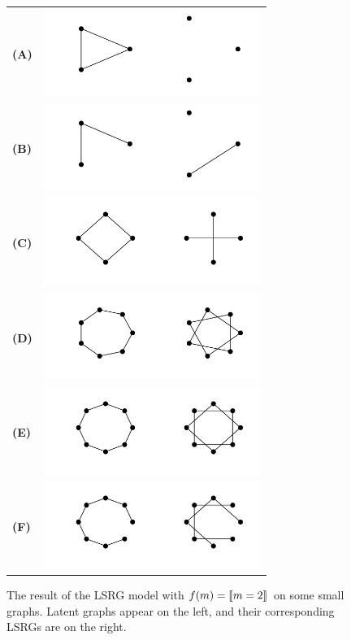 \documentclass[12pt]{article}
\DeclarePairedDelimiter\iverson{\llbracket}{\rrbracket}%
\begin{document}
\begin{figure}[tp]
\begin{center}
\begin{tabular}{m{24pt} m{210pt}}
\textbf{\textsf{(A)}} & \includegraphics[width=200pt]{2_A.png} \\
\textbf{\textsf{(B)}} & \includegraphics[width=200pt]{2_B.png} \\
\textbf{\textsf{(C)}} & \includegraphics[width=200pt]{2_C.png} \\
\textbf{\textsf{(D)}} & \includegraphics[width=200pt]{2_D.png} \\
\textbf{\textsf{(E)}} & \includegraphics[width=200pt]{2_E.png} \\
\textbf{\textsf{(F)}} & \includegraphics[width=200pt]{2_F.png}
\end{tabular}
\caption{The result of the LSRG model with $f(m)=\iverson{m=2}$ on
some small graphs. Latent graphs appear on the left, and their
corresponding LSRGs are on the right.}
\end{center}
\end{figure}
\end{document}
